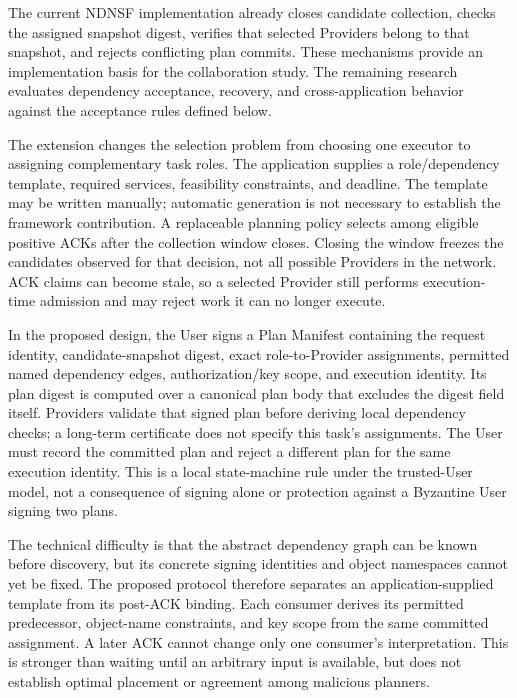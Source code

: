 The current NDNSF implementation already closes candidate collection, checks the assigned snapshot digest, verifies that selected Providers belong to that snapshot, and rejects conflicting plan commits. These mechanisms provide an implementation basis for the collaboration study. The remaining research evaluates dependency acceptance, recovery, and cross-application behavior against the acceptance rules defined below.

The extension changes the selection problem from choosing one executor to assigning complementary task roles. The application supplies a role/dependency template, required services, feasibility constraints, and deadline. The template may be written manually; automatic generation is not necessary to establish the framework contribution. A replaceable planning policy selects among eligible positive ACKs after the collection window closes. Closing the window freezes the candidates observed for that decision, not all possible Providers in the network. ACK claims can become stale, so a selected Provider still performs execution-time admission and may reject work it can no longer execute.

In the proposed design, the User signs a Plan Manifest containing the request identity, candidate-snapshot digest, exact role-to-Provider assignments, permitted named dependency edges, authorization/key scope, and execution identity. Its plan digest is computed over a canonical plan body that excludes the digest field itself. Providers validate that signed plan before deriving local dependency checks; a long-term certificate does not specify this task's assignments. The User must record the committed plan and reject a different plan for the same execution identity. This is a local state-machine rule under the trusted-User model, not a consequence of signing alone or protection against a Byzantine User signing two plans.

The technical difficulty is that the abstract dependency graph can be known before discovery, but its concrete signing identities and object namespaces cannot yet be fixed. The proposed protocol therefore separates an application-supplied template from its post-ACK binding. Each consumer derives its permitted predecessor, object-name constraints, and key scope from the same committed assignment. A later ACK cannot change only one consumer's interpretation. This is stronger than waiting until an arbitrary input is available, but does not establish optimal placement or agreement among malicious planners.

